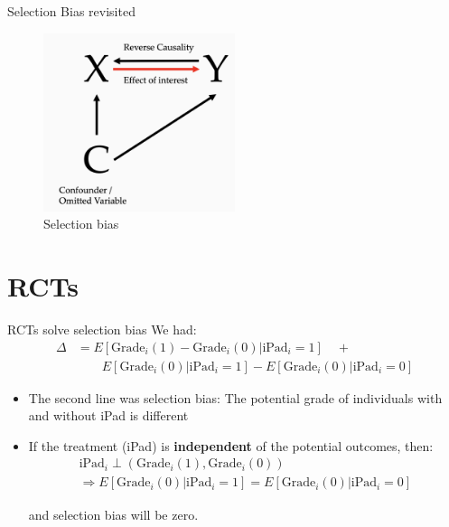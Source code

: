 \documentclass[11pt]{beamer}
\begin{document}
\begin{frame}{Selection Bias revisited}
    \begin{figure}
        \centering
        \includegraphics[width=0.5\textwidth]{DAGs/selectionbias.png}
        \caption{Selection bias}
        \label{fig:selectionbias}
    \end{figure}
\end{frame}








\section{RCTs}

\begin{frame}{RCTs solve selection bias}
We had:
\begin{align*}
   \Delta &= E[\text{Grade}_i(1) - \text{Grade}_i(0) | \text{iPad}_i=1] \quad + \\ 
   & \qquad E[\text{Grade}_i(0)|\text{iPad}_i=1] - E[\text{Grade}_i(0)|\text{iPad}_i=0] 
\end{align*}
\vspace{-0.8cm}
\begin{itemize}
    \item The second line was selection bias: The potential grade of individuals with and without iPad is different
    \item If the treatment (iPad) is \textbf{\alert{independent}} of the potential outcomes, then: 
    \begin{align*}
      \text{iPad}_i \perp \left(\text{Grade}_i(1), \text{Grade}_i(0)\right) \\ \Rightarrow E[\text{Grade}_i(0)|\text{iPad}_i=1] = E[\text{Grade}_i(0)|\text{iPad}_i=0]
    \end{align*}

    and selection bias will be zero.


\end{itemize}
\end{frame}
\end{document}
